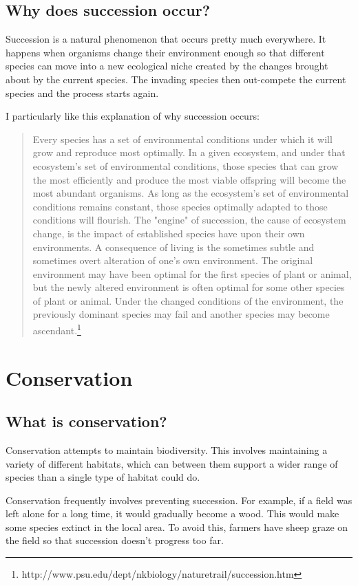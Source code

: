\documentclass{article}
\begin{document}
\subsection*{Why does succession occur?}
Succession is a natural phenomenon that occurs pretty much everywhere. It
happens when organisms change their environment enough so that different species
can move into a new ecological niche created by the changes brought about by the
current species. The invading species then out-compete the current species and
the process starts again.

I particularly like this explanation of why succession occurs:

\begin{quotation}	
	Every species has a set of environmental conditions under which it will grow
	and reproduce most optimally. In a given ecosystem, and under that
	ecosystem's set of environmental conditions, those species that can grow the
	most efficiently and produce the most viable offspring will become the most
	abundant organisms. As long as the ecosystem's set of environmental
	conditions remains constant, those species optimally adapted to those
	conditions will flourish. The "engine" of succession, the cause of ecosystem
	change, is the impact of established species have upon their own
	environments. A consequence of living is the sometimes subtle and sometimes
	overt alteration of one's own environment. The original environment may have
	been optimal for the first species of plant or animal, but the newly altered
	environment is often optimal for some other species of plant or animal.
	Under the changed conditions of the environment, the previously dominant
	species may fail and another species may become ascendant.\footnote{
	http://www.psu.edu/dept/nkbiology/naturetrail/succession.htm}
\end{quotation}

\section*{Conservation}
\subsection*{What is conservation?}
Conservation attempts to maintain biodiversity. This involves maintaining a
variety of different habitats, which can between them support a wider range of
species than a single type of habitat could do.

Conservation frequently involves preventing succession. For example, if a field
was left alone for a long time, it would gradually become a wood. This would
make some species extinct in the local area. To avoid this, farmers have sheep
graze on the field so that succession doesn't progress too far.
\end{document}
